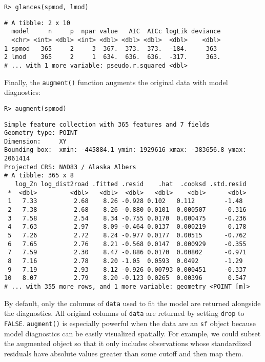 \documentclass[10pt,letterpaper]{article}
\begin{document}
\begin{verbatim}
R> glances(spmod, lmod)
\end{verbatim}

\begin{verbatim}
# A tibble: 2 x 10
  model     n     p  npar value   AIC  AICc logLik deviance
  <chr> <int> <dbl> <int> <dbl> <dbl> <dbl>  <dbl>    <dbl>
1 spmod   365     2     3  367.  373.  373.  -184.     363 
2 lmod    365     2     1  634.  636.  636.  -317.     363.
# ... with 1 more variable: pseudo.r.squared <dbl>
\end{verbatim}

Finally, the \texttt{augment()} function augments the original data with
model diagnostics:

\begin{verbatim}
R> augment(spmod)
\end{verbatim}

\begin{verbatim}
Simple feature collection with 365 features and 7 fields
Geometry type: POINT
Dimension:     XY
Bounding box:  xmin: -445884.1 ymin: 1929616 xmax: -383656.8 ymax: 2061414
Projected CRS: NAD83 / Alaska Albers
# A tibble: 365 x 8
   log_Zn log_dist2road .fitted .resid    .hat  .cooksd .std.resid
 *  <dbl>         <dbl>   <dbl>  <dbl>   <dbl>    <dbl>      <dbl>
 1   7.33          2.68    8.26 -0.928 0.102   0.112        -1.48 
 2   7.38          2.68    8.26 -0.880 0.0101  0.000507     -0.316
 3   7.58          2.54    8.34 -0.755 0.0170  0.000475     -0.236
 4   7.63          2.97    8.09 -0.464 0.0137  0.000219      0.178
 5   7.26          2.72    8.24 -0.977 0.0177  0.00515      -0.762
 6   7.65          2.76    8.21 -0.568 0.0147  0.000929     -0.355
 7   7.59          2.30    8.47 -0.886 0.0170  0.00802      -0.971
 8   7.16          2.78    8.20 -1.05  0.0593  0.0492       -1.29 
 9   7.19          2.93    8.12 -0.926 0.00793 0.000451     -0.337
10   8.07          2.79    8.20 -0.123 0.0265  0.00396       0.547
# ... with 355 more rows, and 1 more variable: geometry <POINT [m]>
\end{verbatim}

\noindent By default, only the columns of \texttt{data} used to fit the
model are returned alongside the diagnostics. All original columns of
\texttt{data} are returned by setting \texttt{drop} to \texttt{FALSE}.
\texttt{augment()} is especially powerful when the data are an
\texttt{sf} object because model diagnostics can be easily visualized
spatially. For example, we could subset the augmented object so that it
only includes observations whose standardized residuals have absolute
values greater than some cutoff and then map them.
\end{document}
